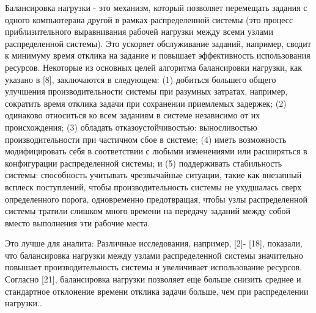 Балансировка нагрузки - это механизм, который позволяет перемещать задания с одного компьютерана другой в рамках распределенной системы (это процесс приблизительного выравнивания рабочей нагрузки между всеми узлами распределенной системы).
Это ускоряет обслуживание заданий, например, сводит к минимуму время отклика на задание и повышает эффективность использования ресурсов.
Некоторые из основных целей алгоритма балансировки нагрузки, как указано в [8], заключаются в следующем: (1) добиться большего общего улучшения производительности системы при разумных затратах, например, сократить время отклика задачи при сохранении приемлемых задержек; (2) одинаково относиться ко всем заданиям в системе независимо от их происхождения; (3) обладать отказоустойчивостью:
выносливостью производительности при частичном сбое в системе; (4) иметь возможность модифицировать себя в соответствии с любыми изменениями или расширяться в конфигурации распределенной системы; и (5) поддерживать стабильность системы: способность учитывать чрезвычайные ситуации, такие как внезапный всплеск поступлений, чтобы производительность системы не ухудшалась сверх определенного порога, одновременно предотвращая, чтобы узлы распределенной системы тратили слишком много времени на передачу заданий между собой вместо выполнения эти рабочие места.
\cite{4}




Это лучше для аналита:
Различные исследования, например, [2]- [18], показали, что балансировка нагрузки между узлами распределенной системы значительно повышает производительность системы и увеличивает использование ресурсов. 
Согласно [21], балансировка нагрузки позволяет еще больше снизить среднее и стандартное отклонение времени отклика задачи больше, чем при распределении нагрузки.\cite{4}.


